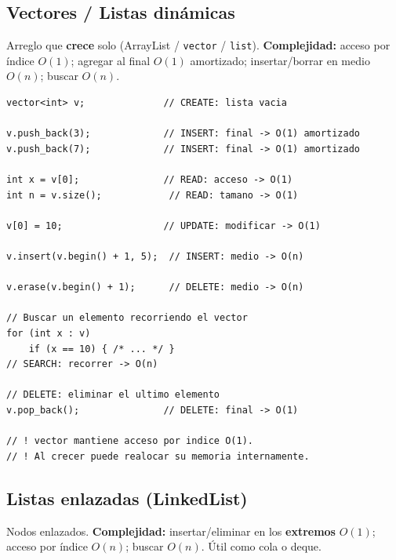 \documentclass[10pt,a4paper,twocolumn]{article}
\begin{document}
\subsection{Vectores / Listas dinámicas}

Arreglo que \textbf{crece} solo (ArrayList / \texttt{vector} /
\texttt{list}). \textbf{Complejidad:} acceso por índice $O(1)$; agregar
al final $O(1)$ amortizado; insertar/borrar en medio $O(n)$; buscar
$O(n)$.

\begin{lstlisting}[style=cpp]
vector<int> v;              // CREATE: lista vacia

v.push_back(3);             // INSERT: final -> O(1) amortizado
v.push_back(7);             // INSERT: final -> O(1) amortizado

int x = v[0];               // READ: acceso -> O(1)
int n = v.size();            // READ: tamano -> O(1)

v[0] = 10;                  // UPDATE: modificar -> O(1)

v.insert(v.begin() + 1, 5);  // INSERT: medio -> O(n)

v.erase(v.begin() + 1);      // DELETE: medio -> O(n)

// Buscar un elemento recorriendo el vector
for (int x : v)
    if (x == 10) { /* ... */ }
// SEARCH: recorrer -> O(n)

// DELETE: eliminar el ultimo elemento
v.pop_back();               // DELETE: final -> O(1)

// ! vector mantiene acceso por indice O(1).
// ! Al crecer puede realocar su memoria internamente.
\end{lstlisting}



\subsection{Listas enlazadas (LinkedList)}

Nodos enlazados. \textbf{Complejidad:} insertar/eliminar en los
\textbf{extremos} $O(1)$; acceso por índice $O(n)$; buscar $O(n)$. Útil
como cola o deque.
\end{document}
